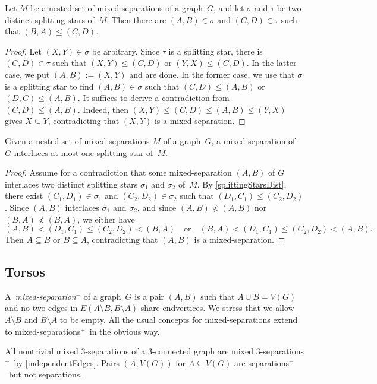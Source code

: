 \documentclass{aic}
\newcommand{\se}{\subseteq}
\theoremstyle{plain}
\theoremstyle{definition}
\theoremstyle{plain}
\newcommand{\plus}{${}^+$}
\theoremstyle{plain}
\newcommand{\sm}{\setminus}
\renewcommand{\le}{\leqslant}
\begin{document}
\begin{lem}\label{splittingStarsDist}
Let $M$ be a nested set of mixed-separations of a graph~$G$, and let $\sigma$ and $\tau$ be two distinct splitting stars of~$M$.
Then there are $(A,B)\in\sigma$ and $(C,D)\in\tau$ such that $(B,A)\le (C,D)$.
\end{lem}
\begin{proof}
Let $(X,Y)\in\sigma$ be arbitrary.
Since $\tau$ is a splitting star, there is $(C,D)\in\tau$ such that $(X,Y)\le (C,D)$ or $(Y,X)\le (C,D)$.
In the latter case, we put $(A,B):=(X,Y)$ and are done.
In the former case, we use that $\sigma$ is a splitting star to find $(A,B)\in\sigma$ such that $(C,D)\le (A,B)$ or $(D,C)\le (A,B)$.
It suffices to derive a contradiction from $(C,D)\le (A,B)$.
Indeed, then $(X,Y)\le (C,D)\le (A,B)\le (Y,X)$ gives $X\se Y$, contradicting that $(X,Y)$ is a mixed-separation.
\end{proof}

\begin{lem}\label{unique_split}
Given a nested set of mixed-separations $M$ of a graph~$G$, a mixed-separation of~$G$ interlaces at most one splitting star of~$M$.
\end{lem}
\begin{proof}
Assume for a contradiction that some mixed-separation $(A,B)$ of $G$ interlaces two distinct splitting stars $\sigma_1$ and $\sigma_2$ of~$M$.
By \autoref{splittingStarsDist}, there exist $(C_1,D_1)\in\sigma_1$ and $(C_2,D_2)\in\sigma_2$ such that $(D_1,C_1)\le (C_2,D_2)$.
Since $(A,B)$ interlaces $\sigma_1$ and $\sigma_2$, and since $(A,B)\not < (A,B)$ nor $(B,A)\not < (B,A)$, we either have
\[
    (A,B)<(D_1,C_1)\le (C_2,D_2)<(B,A)\quad\text{or}\quad(B,A)<(D_1,C_1)\le (C_2,D_2)<(A,B).
\]
Then $A\se B$ or $B\se A$, contradicting that $(A,B)$ is a mixed-separation.
\end{proof}

\subsection{Torsos}\label{subsec:Torsos}

A~\emph{mixed-separation\plus } of a graph~$G$ is a pair $(A,B)$ such that $A\cup B=V(G)$ and no two edges in $E(A\sm B,B\sm A)$ share endvertices.
We stress that we allow $A\sm B$ and $B\sm A$ to be empty.
All the usual concepts for mixed-separations extend to mixed-separations\plus\ in the obvious way.

\begin{eg}
All nontrivial mixed 3-separations of a 3-connected graph are mixed 3-separations\plus\ by \autoref{independentEdges}.
Pairs $(A,V(G))$ for $A\se V(G)$ are separations\plus\ but not separations.
\end{eg}
\end{document}
